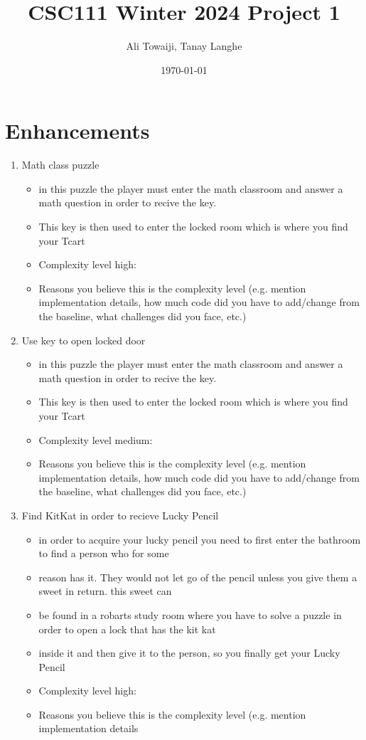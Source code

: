 \documentclass[11pt]{article}
\title{CSC111 Winter 2024 Project 1}
\author{Ali Towaiji, Tanay Langhe}
\date{\today}
\begin{document}
\maketitle

\section*{Enhancements}


\begin{enumerate}

\item Math class puzzle
	\begin{itemize}
	\item in this puzzle the player must enter the math classroom and answer a math question in order to recive the key.
	\item This key is then used to enter the locked room which is where you find your Tcart
	\item Complexity level high:
	\item Reasons you believe this is the complexity level (e.g. mention implementation details, how much code did you have to add/change from the baseline, what challenges did you face, etc.)
	\end{itemize}

\item Use key to open locked door
	\begin{itemize}
	\item in this puzzle the player must enter the math classroom and answer a math question in order to recive the key.
	\item This key is then used to enter the locked room which is where you find your Tcart
	\item Complexity level medium:
	\item Reasons you believe this is the complexity level (e.g. mention implementation details, how much code did you have to add/change from the baseline, what challenges did you face, etc.)
	\end{itemize}

\item Find KitKat in order to recieve Lucky Pencil
	\begin{itemize}
	\item in order to acquire your lucky pencil you need to first enter the bathroom to find a person who for some
	\item reason has it. They would not let go of the pencil unless you give them a sweet in return. this sweet can
	\item be found in a robarts study room where you have to solve a puzzle in order to open a lock that has the kit kat
	\item inside it and then give it to the person, so you finally get your Lucky Pencil
	\item Complexity level high:
	\item Reasons you believe this is the complexity level (e.g. mention implementation details
	\end{itemize}


\end{enumerate}
\end{document}
